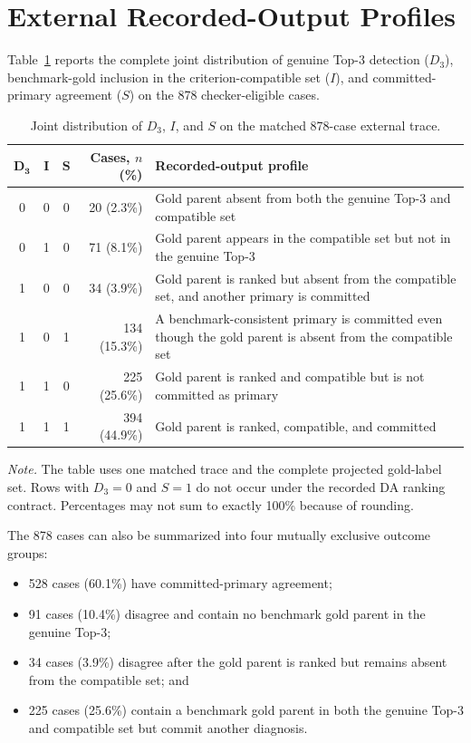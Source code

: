 \section{External Recorded-Output Profiles}
\label{sec:external-stagewise}

Table~\ref{tab:external-disagreement-profiles} reports the complete joint distribution of genuine Top-3 detection (\(D_3\)), benchmark-gold inclusion in the criterion-compatible set (\(I\)), and committed-primary agreement (\(S\)) on the 878 checker-eligible cases.

\begin{table}[htbp]
\centering
\caption{Joint distribution of \(D_3\), \(I\), and \(S\) on the matched 878-case external trace.}
\label{tab:external-disagreement-profiles}
\small
\setlength{\tabcolsep}{4pt}
\begin{tabularx}{\textwidth}{|c|c|c|r|>{\raggedright\arraybackslash}X|}
\hline
\(\boldsymbol{D_3}\) & \(\boldsymbol{I}\) & \(\boldsymbol{S}\) & \textbf{Cases, \(n\) (\%)} & \textbf{Recorded-output profile}\\
\hline
0 & 0 & 0 & 20 (2.3\%) & Gold parent absent from both the genuine Top-3 and compatible set\\
\hline
0 & 1 & 0 & 71 (8.1\%) & Gold parent appears in the compatible set but not in the genuine Top-3\\
\hline
1 & 0 & 0 & 34 (3.9\%) & Gold parent is ranked but absent from the compatible set, and another primary is committed\\
\hline
1 & 0 & 1 & 134 (15.3\%) & A benchmark-consistent primary is committed even though the gold parent is absent from the compatible set\\
\hline
1 & 1 & 0 & 225 (25.6\%) & Gold parent is ranked and compatible but is not committed as primary\\
\hline
1 & 1 & 1 & 394 (44.9\%) & Gold parent is ranked, compatible, and committed\\
\hline
\end{tabularx}
\parbox{0.96\textwidth}{\footnotesize
\textit{Note.} The table uses one matched trace and the complete projected gold-label set. Rows with \(D_3=0\) and \(S=1\) do not occur under the recorded DA ranking contract. Percentages may not sum to exactly 100\% because of rounding.}
\end{table}

The 878 cases can also be summarized into four mutually exclusive outcome groups:

\begin{itemize}
    \item 528 cases (60.1\%) have committed-primary agreement;
    \item 91 cases (10.4\%) disagree and contain no benchmark gold parent in the genuine Top-3;
    \item 34 cases (3.9\%) disagree after the gold parent is ranked but remains absent from the compatible set; and
    \item 225 cases (25.6\%) contain a benchmark gold parent in both the genuine Top-3 and compatible set but commit another diagnosis.
\end{itemize}

